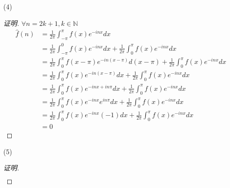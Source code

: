 \documentclass{article}
\begin{document}
\begin{enumerate}
\begin{enumerate}
\begin{proof}[证明]
\begin{equation}
\begin{aligned}
                \end{aligned}
            \end{equation}
            而由(1)知, \begin{equation}
                \begin{aligned}
                    f(x)
                    &\sim\hat{f}(0)+\sum_{n\geq1}(\hat{f}(n)+\hat{f}(-n))\cos nx+i(\hat{f}(n)-\hat{f}(-n))\sin nx \\
                    &=\sum_{n\geq1}2i\hat{f}(n)\sin nx
                \end{aligned}
            \end{equation}
            因此 $f$ 的 Fourier 级数是正弦级数.
        \end{proof}
        \item[(4)] \begin{proof}[证明]
            $\forall n=2k+1, k\in\mathbb{N}$
            \begin{equation}
                \begin{aligned}
                    \hat{f}(n)
                    &=\frac{1}{2\pi}\int_{-\pi}^{\pi}f(x)e^{-inx}dx \\
                    &=\frac{1}{2\pi}\int_{-\pi}^{0}f(x)e^{-inx}dx+\frac{1}{2\pi}\int_{0}^{\pi}f(x)e^{-inx}dx \\
                    &=\frac{1}{2\pi}\int_{0}^{\pi}f(x-\pi)e^{-in(x-\pi)}d(x-\pi)+\frac{1}{2\pi}\int_{0}^{\pi}f(x)e^{-inx}dx \\
                    &=\frac{1}{2\pi}\int_{0}^{\pi}f(x)e^{-in(x-\pi)}dx+\frac{1}{2\pi}\int_{0}^{\pi}f(x)e^{-inx}dx \\
                    &=\frac{1}{2\pi}\int_{0}^{\pi}f(x)e^{-inx+in\pi}dx+\frac{1}{2\pi}\int_{0}^{\pi}f(x)e^{-inx}dx \\
                    &=\frac{1}{2\pi}\int_{0}^{\pi}f(x)e^{-inx}e^{in\pi}dx+\frac{1}{2\pi}\int_{0}^{\pi}f(x)e^{-inx}dx \\
                    &=\frac{1}{2\pi}\int_{0}^{\pi}f(x)e^{-inx}(-1)dx+\frac{1}{2\pi}\int_{0}^{\pi}f(x)e^{-inx}dx \\
                    &=0
                \end{aligned}
            \end{equation}
        \end{proof}
        \item[(5)] \begin{proof}[证明]
            \begin{equation}
                \begin{aligned}

\end{aligned}
\end{equation}
\end{proof}
\end{enumerate}
\end{enumerate}
\end{document}
